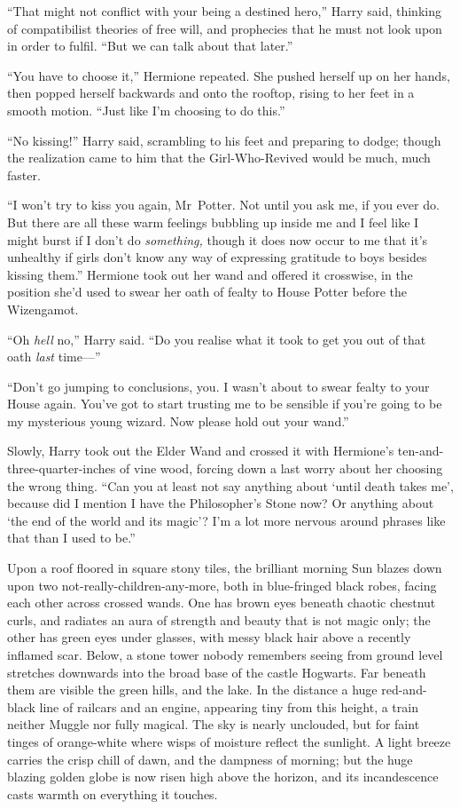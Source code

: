 “That might not conflict with your being a destined hero,” Harry said, thinking of compatibilist theories of free will, and prophecies that he must not look upon in order to fulfil. “But we can talk about that later.”

“You have to choose it,” Hermione repeated. She pushed herself up on her hands, then popped herself backwards and onto the rooftop, rising to her feet in a smooth motion. “Just like I’m choosing to do this.”

“No kissing!” Harry said, scrambling to his feet and preparing to dodge; though the realization came to him that the Girl-Who-Revived would be much, much faster.

“I won’t try to kiss you again, Mr~Potter. Not until you ask me, if you ever do. But there are all these warm feelings bubbling up inside me and I feel like I might burst if I don’t do \emph{something,} though it does now occur to me that it’s unhealthy if girls don’t know any way of expressing gratitude to boys besides kissing them.” Hermione took out her wand and offered it crosswise, in the position she’d used to swear her oath of fealty to House Potter before the Wizengamot.

“Oh \emph{hell} no,” Harry said. “Do you realise what it took to get you out of that oath \emph{last} time—”

“Don’t go jumping to conclusions, you. I wasn’t about to swear fealty to your House again. You’ve got to start trusting me to be sensible if you’re going to be my mysterious young wizard. Now please hold out your wand.”

Slowly, Harry took out the Elder Wand and crossed it with Hermione’s ten-and-three-quarter-inches of vine wood, forcing down a last worry about her choosing the wrong thing. “Can you at least not say anything about ‘until death takes me’, because did I mention I have the Philosopher’s Stone now? Or anything about ‘the end of the world and its magic’? I’m a lot more nervous around phrases like that than I used to be.”

\later

Upon a roof floored in square stony tiles, the brilliant morning Sun blazes down upon two not-really-children-any-more, both in blue-fringed black robes, facing each other across crossed wands. One has brown eyes beneath chaotic chestnut curls, and radiates an aura of strength and beauty that is not magic only; the other has green eyes under glasses, with messy black hair above a recently inflamed scar. Below, a stone tower nobody remembers seeing from ground level stretches downwards into the broad base of the castle Hogwarts. Far beneath them are visible the green hills, and the lake. In the distance a huge red-and-black line of railcars and an engine, appearing tiny from this height, a train neither Muggle nor fully magical. The sky is nearly unclouded, but for faint tinges of orange-white where wisps of moisture reflect the sunlight. A light breeze carries the crisp chill of dawn, and the dampness of morning; but the huge blazing golden globe is now risen high above the horizon, and its incandescence casts warmth on everything it touches.

